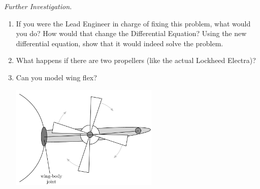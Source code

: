\vfill

\emph{Further Investigation. } 
\begin{enumerate}[label=\emph{\arabic*.}]
\item If you were the Lead Engineer in charge of fixing this problem, what would you do? How would that change the Differential Equation? Using the new differential equation, show that it would indeed solve the problem.

\item What happens if there are two propellers (like the actual Lockheed Electra)?

\item Can you model wing flex?
\begin{center}
\includegraphics*[width=200pt]{images/project-wing-wing2.pdf}
\end{center}
\end{enumerate}

\begin{noexercises}
\end{noexercises}